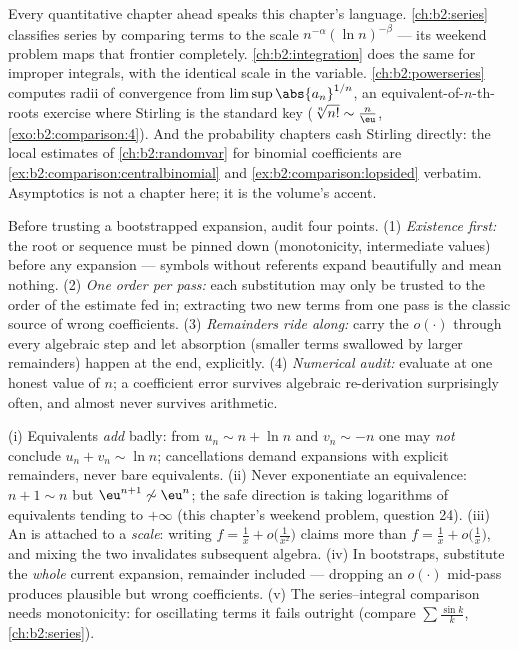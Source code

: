 \begin{remark}\label{rem:b2:comparison:perspectives}
Every quantitative chapter ahead speaks this chapter's
language. \cref{ch:b2:series} classifies series by comparing
terms to the scale $n^{-\alpha}(\ln n)^{-\beta}$ --- its
weekend problem maps that frontier completely.
\cref{ch:b2:integration} does the same for improper integrals,
with the identical scale in the  variable.
\cref{ch:b2:powerseries} computes radii of convergence from
$\limsup\abs{a_n}^{1/n}$, an equivalent-of-$n$-th-roots
exercise where Stirling is the standard key ($\sqrt[n]{n!}
\sim \frac n\eu$, \cref{exo:b2:comparison:4}). And the
probability chapters cash Stirling directly: the local
estimates of \cref{ch:b2:randomvar} for binomial coefficients
are \cref{ex:b2:comparison:centralbinomial} and
\cref{ex:b2:comparison:lopsided} verbatim. Asymptotics is not
a chapter here; it is the volume's accent.
\end{remark}

\begin{method}\label{met:b2:comparison:checklist}
Before trusting a bootstrapped expansion, audit four points.
(1) \emph{Existence first:} the root or sequence must be pinned
down (monotonicity, intermediate values) before any expansion
--- symbols without referents expand beautifully and mean
nothing. (2) \emph{One order per pass:} each substitution may
only be trusted to the order of the estimate fed in; extracting
two new terms from one pass is the classic source of wrong
coefficients. (3) \emph{Remainders ride along:} carry the
$o(\cdot)$ through every algebraic step and let absorption
(smaller terms swallowed by larger remainders) happen at the
end, explicitly. (4) \emph{Numerical audit:} evaluate at one
honest value of $n$; a coefficient error survives algebraic
re-derivation surprisingly often, and almost never survives
arithmetic.
\end{method}

\begin{remark}\label{rem:b2:comparison:pitfalls}
(i) Equivalents \emph{add} badly: from $u_n \sim n + \ln n$ and
$v_n \sim -n$ one may \emph{not} conclude $u_n + v_n \sim \ln
n$; cancellations demand expansions with explicit remainders,
never bare equivalents. (ii) Never exponentiate an equivalence:
$n + 1 \sim n$ but $\eu^{n+1} \not\sim \eu^n$; the safe
direction is taking logarithms of equivalents tending to
$+\infty$ (this chapter's weekend problem, question 24). (iii)
An  is attached to a \emph{scale}: writing
$f = \frac1x + o\bigl(\frac1{x^2}\bigr)$ claims more than $f =
\frac1x + o\bigl(\frac1x\bigr)$, and mixing the two invalidates
subsequent algebra. (iv) In bootstraps, substitute the
\emph{whole} current expansion, remainder included --- dropping
an $o(\cdot)$ mid-pass produces plausible but wrong
coefficients. (v) The series--integral comparison needs
monotonicity: for oscillating terms it fails outright (compare
$\sum\frac{\sin k}k$, \cref{ch:b2:series}).
\end{remark}


